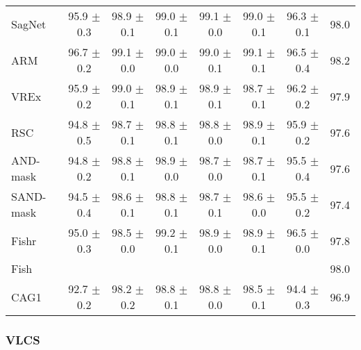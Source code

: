 \documentclass{article}
\begin{document}
\begin{center}
{\begin{tabular}{lccccccc}
SagNet               & 95.9 $\pm$ 0.3       & 98.9 $\pm$ 0.1       & 99.0 $\pm$ 0.1       & 99.1 $\pm$ 0.0       & 99.0 $\pm$ 0.1       & 96.3 $\pm$ 0.1       & 98.0                 \\
ARM                  & 96.7 $\pm$ 0.2       & 99.1 $\pm$ 0.0       & 99.0 $\pm$ 0.0       & 99.0 $\pm$ 0.1       & 99.1 $\pm$ 0.1       & 96.5 $\pm$ 0.4       & 98.2                 \\
VREx                 & 95.9 $\pm$ 0.2       & 99.0 $\pm$ 0.1       & 98.9 $\pm$ 0.1       & 98.9 $\pm$ 0.1       & 98.7 $\pm$ 0.1       & 96.2 $\pm$ 0.2       & 97.9                 \\
RSC                  & 94.8 $\pm$ 0.5       & 98.7 $\pm$ 0.1       & 98.8 $\pm$ 0.1       & 98.8 $\pm$ 0.0       & 98.9 $\pm$ 0.1       & 95.9 $\pm$ 0.2       & 97.6                 \\
AND-mask             & 94.8 $\pm$ 0.2       & 98.8 $\pm$ 0.1       & 98.9 $\pm$ 0.0       & 98.7 $\pm$ 0.0       & 98.7 $\pm$ 0.1       & 95.5 $\pm$ 0.4       & 97.6                 \\
SAND-mask            & 94.5 $\pm$ 0.4       & 98.6 $\pm$ 0.1       & 98.8 $\pm$ 0.1       & 98.7 $\pm$ 0.1       & 98.6 $\pm$ 0.0       & 95.5 $\pm$ 0.2       & 97.4                 \\
Fishr                & 95.0 $\pm$ 0.3       & 98.5 $\pm$ 0.0       & 99.2 $\pm$ 0.1       & 98.9 $\pm$ 0.0       & 98.9 $\pm$ 0.1       & 96.5 $\pm$ 0.0       & 97.8                 \\
Fish                 &                      &                      &                      &                      &                      &                      & 98.0                 \\
\midrule
CAG1                 & 92.7 $\pm$ 0.2       & 98.2 $\pm$ 0.2       & 98.8 $\pm$ 0.1       & 98.8 $\pm$ 0.0       & 98.5 $\pm$ 0.1       & 94.4 $\pm$ 0.3       & 96.9                 \\
\bottomrule
\end{tabular}}
\end{center}



\subsubsection{VLCS}
\end{document}
